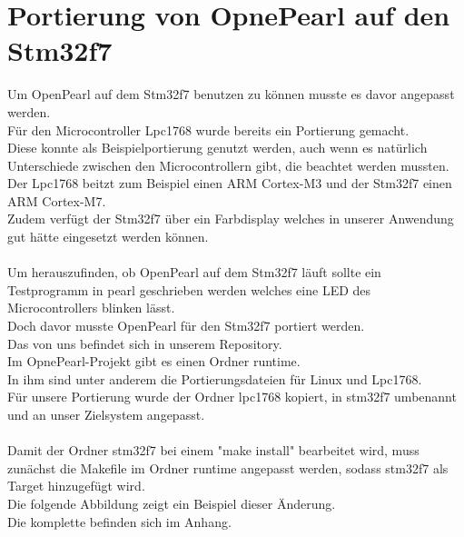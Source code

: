 \section{Portierung von OpnePearl auf den Stm32f7}
Um OpenPearl auf dem Stm32f7 benutzen zu können musste es davor angepasst werden.\\
Für den Microcontroller Lpc1768 wurde bereits ein Portierung gemacht.\\
Diese konnte als Beispielportierung genutzt werden, auch wenn es natürlich Unterschiede zwischen den Microcontrollern gibt, die beachtet werden mussten.\\
Der Lpc1768 beitzt zum Beispiel einen ARM Cortex-M3 und der Stm32f7 einen ARM Cortex-M7.\\
Zudem verfügt der Stm32f7 über ein Farbdisplay welches in unserer Anwendung gut hätte eingesetzt werden können.\\
\\
Um herauszufinden, ob OpenPearl auf dem Stm32f7 läuft sollte ein Testprogramm in pearl geschrieben werden welches eine LED des Microcontrollers blinken lässt.\\
Doch davor musste OpenPearl für den Stm32f7 portiert werden.\\
Das von uns  befindet sich in unserem Repository.\\
Im OpnePearl-Projekt gibt es einen Ordner runtime.\\
In ihm sind unter anderem die Portierungsdateien für Linux und Lpc1768.\\
Für unsere Portierung wurde der Ordner lpc1768 kopiert, in stm32f7 umbenannt und an unser Zielsystem angepasst.\\
\\
Damit der Ordner stm32f7 bei einem "make install" bearbeitet wird, muss zunächst die Makefile im Ordner runtime angepasst werden, sodass stm32f7 als Target hinzugefügt wird.\\
Die folgende Abbildung zeigt ein Beispiel dieser Änderung.\\
Die komplette  befinden sich im Anhang.\\
